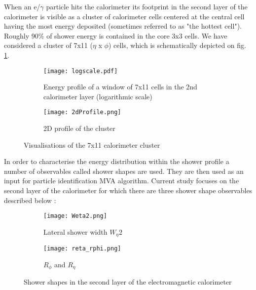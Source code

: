   When an e/$\gamma$ particle hits the calorimeter its footprint in the second layer of the calorimeter is visible as a cluster of calorimeter cells centered at the central cell having the most energy deposited (sometimes referred to as "the hottest cell"). Roughly 90$\%$ of shower energy is contained in the core 3x3 cells.  We have considered a cluster of 7x11 ($\eta$ x $\phi$) cells, which is schematically depicted on fig. \ref{fig::profile_log}.
  
  
    	\begin{figure}[htbp]
  	\begin{subfigure}[t]{0.5\textwidth}
  		\texttt{[image: logscale.pdf]}
  		\caption{Energy profile of a window of 7x11 cells in the 2nd calorimeter layer (logarithmic scale)}
  		\label{fig::profile_log}
  	\end{subfigure}
  	\hfill
  	\begin{subfigure}[t]{0.5\textwidth} 
  		\texttt{[image: 2dProfile.png]}
  		\caption{2D profile of the cluster}
  		\label{fig::2d_profile}
  	\end{subfigure}
  	\caption{Visualisations of the 7x11 calorimeter cluster}
  	\label{fig::profiles}
  \end{figure}
  
  In order to characterise the energy distribution within the shower profile a number of observables called shower shapes are used. They are then used as an input for particle identification MVA algorithm. Current study focuses on the second layer of the calorimeter for which there are three shower shape observables described below \cite{egamma_perf_2017}:
  
    	\begin{figure}[htbp]
  	\begin{subfigure}[t]{0.4\textwidth}
  		\texttt{[image: Weta2.png]}
  		\caption[Lateral shower width $W_{\eta} 2$]{Lateral shower width $W_{\eta} 2$}
  		\label{fig::weta2}
  	\end{subfigure}
  	\hfill
  	\begin{subfigure}[t]{0.25\textwidth} 
  		\texttt{[image: reta\_rphi.png]}
  		\caption[$R_{\phi}$ and $R_{\eta}$]{$R_{\phi}$ and $R_{\eta}$}
  		\label{fig::reta_rphi}
  	\end{subfigure}
  	\caption{Shower shapes in the second layer of the electromagnetic calorimeter}
  	\label{fig::sshapes}
  \end{figure}
  
